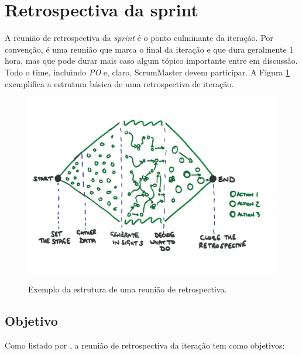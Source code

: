 \documentclass{iiufrgs}
\begin{document}

\section{Retrospectiva da sprint}

A reunião de retrospectiva da \textit{sprint} é o ponto culminante da iteração. Por convenção, é uma reunião que marca o final da iteração e que dura geralmente 1 hora, mas que pode durar mais caso algum tópico importante entre em discussão. Todo o time, incluindo \textit{PO} e, claro, ScrumMaster devem participar. A Figura \ref{fig:retro} exemplifica a estrutura básica de uma retrospectiva de iteração.

\begin{figure}[htbp]
    \centering
    \caption{Exemplo da estrutura de uma reunião de retrospectiva.}
    \includegraphics[scale=0.8]{images/retro-structure.png}
    \label{fig:retro}
\end{figure}

\subsection{Objetivo}

Como listado por \citeauthor{Adkins2010Coaching}, a reunião de retrospectiva da iteração tem como objetivos:
\end{document}

